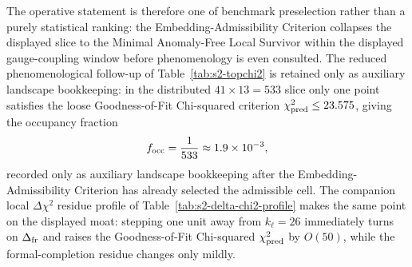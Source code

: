 \documentclass[11pt]{article}
\begin{document}
The operative statement is therefore one of benchmark preselection rather than a purely statistical ranking: the Embedding-Admissibility Criterion collapses the displayed slice to the Minimal Anomaly-Free Local Survivor within the displayed gauge-coupling window before phenomenology is even consulted.
The reduced phenomenological follow-up of Table~\ref{tab:s2-topchi2} is retained only as auxiliary landscape bookkeeping: in the distributed $41\times13=533$ slice only one point satisfies the loose Goodness-of-Fit Chi-squared criterion $\chi^2_{\rm pred}\leq23.575$, giving the occupancy fraction
\begin{equation}
 f_{\rm occ}=\frac{1}{533}\approx1.9\times10^{-3},
\end{equation}
recorded only as auxiliary landscape bookkeeping after the Embedding-Admissibility Criterion has already selected the admissible cell. The companion local $\Delta\chi^2$ residue profile of Table~\ref{tab:s2-delta-chi2-profile} makes the same point on the displayed moat: stepping one unit away from $k_{\ell}=26$ immediately turns on $\Delta_{\rm fr}$ and raises the Goodness-of-Fit Chi-squared $\chi^2_{\rm pred}$ by $O(50)$, while the formal-completion residue changes only mildly.
\end{document}
